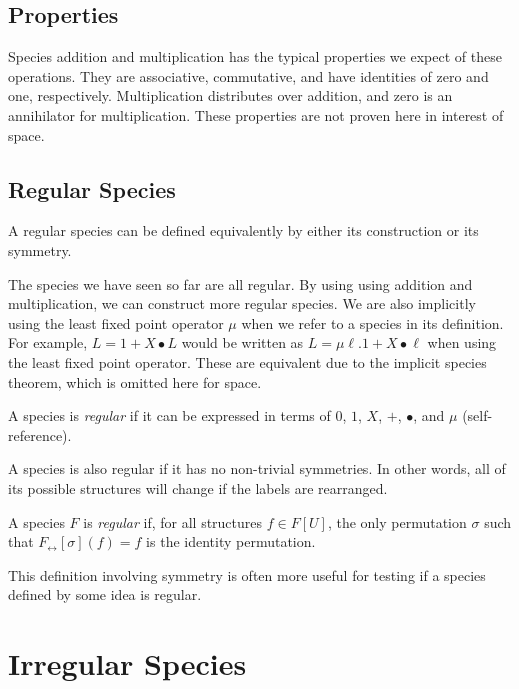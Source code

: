 \documentclass{article}
\begin{document}
\subsection{Properties}
Species addition and multiplication has the typical properties we expect of these operations.  They
are associative, commutative, and have identities of zero and one, respectively.  Multiplication
distributes over addition, and zero is an annihilator for multiplication. These properties are not
proven here in interest of space.

\subsection{Regular Species}
A regular species can be defined equivalently by either its construction or its symmetry.

The species we have seen so far are all regular. By using using addition and multiplication, we can
construct more regular species. We are also implicitly using the least fixed point operator \(\mu \)
when we refer to a species in its definition. For example, \( L = 1 + X \bullet L \) would be
written as \( L = \mu \ell. 1 + X \bullet \ell \) when using the least fixed point operator. These
are equivalent due to the implicit species theorem, which is omitted here for space.~\cite{yorgey}

\begin{definition}
  A species is \emph{regular} if it can be expressed in terms of \( 0 \), \( 1 \), \( X \), \( + \),
  \( \bullet \), and \( \mu \) (self-reference).~\cite{yorgey}
\end{definition}

A species is also regular if it has no non-trivial symmetries. In other words, all of its possible
structures will change if the labels are rearranged.

\begin{definition}
  A species \( F \) is \emph{regular} if, for all structures \( f \in F[U] \), the only permutation
  \(\sigma \) such that \( F_\leftrightarrow [\sigma] (f) = f \) is the identity
  permutation.~\cite{yorgey}
\end{definition}

This definition involving symmetry is often more useful for testing if a species defined by some
idea is regular.

\section{Irregular Species}
\end{document}
